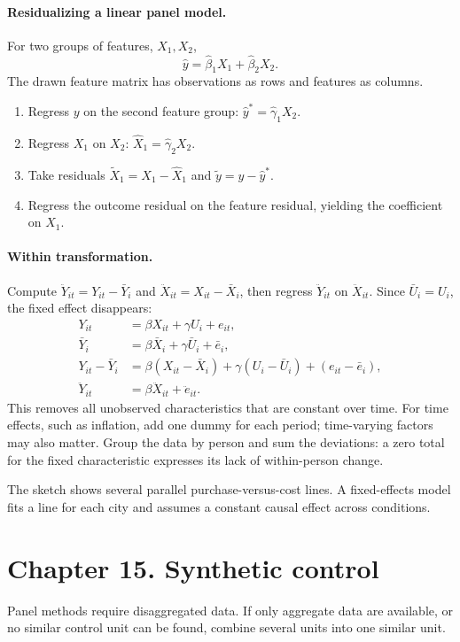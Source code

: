 \paragraph{Residualizing a linear panel model.}
For two groups of features, $X_1,X_2$,
\[\hat y=\hat\beta_1X_1+\hat\beta_2X_2.\]
The drawn feature matrix has observations as rows and features as columns.
\begin{enumerate}
\item Regress $y$ on the second feature group: $\hat y^*=\hat\gamma_1X_2$.
\item Regress $X_1$ on $X_2$: $\hat X_1=\hat\gamma_2X_2$.
\item Take residuals $\widetilde X_1=X_1-\hat X_1$ and $\widetilde y=y-\hat y^*$.
\item Regress the outcome residual on the feature residual, yielding the coefficient on $X_1$.
\end{enumerate}

\paragraph{Within transformation.}
Compute $\ddot Y_{it}=Y_{it}-\bar Y_i$ and $\ddot X_{it}=X_{it}-\bar X_i$, then regress $\ddot Y_{it}$ on $\ddot X_{it}$. Since $\bar U_i=U_i$, the fixed effect disappears:
\begin{align*}
Y_{it}&=\beta X_{it}+\gamma U_i+e_{it},\\
\bar Y_i&=\beta\bar X_i+\gamma\bar U_i+\bar e_i,\\
Y_{it}-\bar Y_i&=\beta(X_{it}-\bar X_i)+\gamma(U_i-\bar U_i)+(e_{it}-\bar e_i),\\
\ddot Y_{it}&=\beta\ddot X_{it}+\ddot e_{it}.
\end{align*}
This removes all unobserved characteristics that are constant over time. For time effects, such as inflation, add one dummy for each period; time-varying factors may also matter. Group the data by person and sum the deviations: a zero total for the fixed characteristic expresses its lack of within-person change.

The sketch shows several parallel purchase-versus-cost lines. A fixed-effects model fits a line for each city and assumes a constant causal effect across conditions.

\section{Chapter 15. Synthetic control}
Panel methods require disaggregated data. If only aggregate data are available, or no similar control unit can be found, combine several units into one similar unit.

